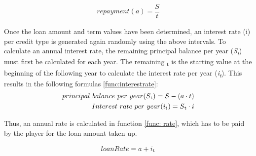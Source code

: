 \begin{equation}
\label{func:repayment}
\begin{aligned}
repayment (a)= {\dfrac{S}{t}}
\end{aligned}    
\end{equation}

Once the loan amount and term values have been determined, an interest rate (\gls{i}) per credit type is generated again randomly using the above intervals. To calculate an annual interest rate, the remaining principal balance per year (\textit{S\textsubscript{t}}) must first be calculated for each year. The remaining \textsubscript{t}  is the starting value at the beginning of the following year to calculate the interest rate per year (\textit{i\textsubscript{t}}). This results in the following formulas \ref{func:interestrate}:
\begin{equation}
\label{func:interestrate}
\begin{aligned}
principal \ balance \ per \ year (S\textsubscript{t})= S- (a \cdot t)\\
Interest \ rate \ per \ year (i\textsubscript{t}) = S\textsubscript{t} \cdot i
\end{aligned}    
\end{equation}

Thus, an annual rate is calculated in function \ref{func: rate}, which has to be paid by the player for the loan amount taken up.

\begin{equation}
\label{func: rate}
\begin{aligned}
loanRate = a+ i\textsubscript{t}
\end{aligned}    
\end{equation}


